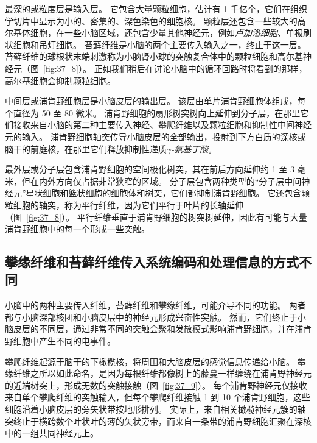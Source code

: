 最深的或粒度层是输入层。
它包含大量颗粒细胞，估计有 1 千亿个，它们在组织学切片中显示为小的、密集的、深色染色的细胞核。
颗粒层还包含一些较大的高尔基体细胞，在一些小脑区域，还包含少量其他神经元，例如\textit{卢加洛细胞}、单极刷状细胞和吊灯细胞。
苔藓纤维是小脑的两个主要传入输入之一，终止于这一层。
苔藓纤维的球根状末端刺激称为小脑肾小球的突触复合体中的颗粒细胞和高尔基神经元（图~\ref{fig:37_8}）。
正如我们稍后在讨论小脑中的循环回路时将看到的那样，高尔基细胞会抑制颗粒细胞。


中间层或浦肯野细胞层是小脑皮层的输出层。
该层由单片浦肯野细胞体组成，每个直径为 50 至 80 微米。
浦肯野细胞的扇形树突树向上延伸到分子层，在那里它们接收来自小脑的第二种主要传入神经、攀爬纤维以及颗粒细胞和抑制性中间神经元的输入。
浦肯野细胞轴突传导小脑皮层的全部输出，投射到下方白质的深核或脑干的前庭核，在那里它们释放抑制性递质\textit{$ \gamma $-氨基丁酸}。


最外层或分子层包含浦肯野细胞的空间极化树突，其在前后方向延伸约 1 至 3 毫米，但在内外方向仅占据非常狭窄的区域。
分子层包含两种类型的“分子层中间神经元”星状细胞和篮状细胞的细胞体和树突，它们都抑制浦肯野细胞。
它还包含颗粒细胞的轴突，称为平行纤维，因为它们平行于叶片的长轴延伸（图~\ref{fig:37_8}）。
平行纤维垂直于浦肯野细胞的树突树延伸，因此有可能与大量浦肯野细胞中的每一个形成一些突触。



\subsection{攀缘纤维和苔藓纤维传入系统编码和处理信息的方式不同}

小脑中的两种主要传入纤维，苔藓纤维和攀缘纤维，可能介导不同的功能。
两者都与小脑深部核团和小脑皮层中的神经元形成兴奋性突触。
然而，它们终止于小脑皮层的不同层，通过非常不同的突触会聚和发散模式影响浦肯野细胞，并在浦肯野细胞中产生不同的电事件。


攀爬纤维起源于脑干的下橄榄核，将周围和大脑皮层的感觉信息传递给小脑。
攀缘纤维之所以如此命名，是因为每根纤维都像树上的藤蔓一样缠绕在浦肯野神经元的近端树突上，形成无数的突触接触（图~\ref{fig:37_9}）。
每个浦肯野神经元仅接收来自单个攀爬纤维的突触输入，但每个攀爬纤维接触 1 到 10 个浦肯野细胞，这些细胞沿着小脑皮层的旁矢状带按地形排列。
实际上，来自相关橄榄神经元簇的轴突终止于横跨数个叶状叶的薄的矢状旁带，而来自一条带的浦肯野细胞汇聚在深核中的一组共同神经元上。


